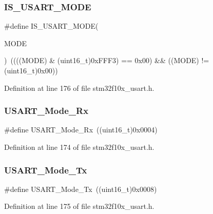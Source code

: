 \subsubsection{\texorpdfstring{I\+S\+\_\+\+U\+S\+A\+R\+T\+\_\+\+M\+O\+DE}{IS\_USART\_MODE}}
{\footnotesize\ttfamily \#define I\+S\+\_\+\+U\+S\+A\+R\+T\+\_\+\+M\+O\+DE(\begin{DoxyParamCaption}\item[{}]{M\+O\+DE }\end{DoxyParamCaption})~((((M\+O\+DE) \& (uint16\+\_\+t)0x\+F\+F\+F3) == 0x00) \&\& ((\+M\+O\+D\+E) != (uint16\+\_\+t)0x00))}



Definition at line 176 of file stm32f10x\+\_\+usart.\+h.

\mbox{\label{group___u_s_a_r_t___mode_gafefcc3d3c1a1f83b425784fa6289aecf}} 
\subsubsection{\texorpdfstring{U\+S\+A\+R\+T\+\_\+\+Mode\+\_\+\+Rx}{USART\_Mode\_Rx}}
{\footnotesize\ttfamily \#define U\+S\+A\+R\+T\+\_\+\+Mode\+\_\+\+Rx~((uint16\+\_\+t)0x0004)}



Definition at line 174 of file stm32f10x\+\_\+usart.\+h.

\mbox{\label{group___u_s_a_r_t___mode_ga22b2813509a062435ea68d086ec565b4}} 
\subsubsection{\texorpdfstring{U\+S\+A\+R\+T\+\_\+\+Mode\+\_\+\+Tx}{USART\_Mode\_Tx}}
{\footnotesize\ttfamily \#define U\+S\+A\+R\+T\+\_\+\+Mode\+\_\+\+Tx~((uint16\+\_\+t)0x0008)}



Definition at line 175 of file stm32f10x\+\_\+usart.\+h.


